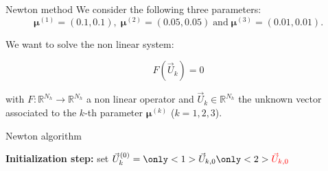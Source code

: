 \begin{frame}{Newton method}
	We consider the following three parameters:
	$$\bm{\mu}^{(1)} = (0.1,0.1), \; \bm{\mu}^{(2)} = (0.05,0.05) \; \text{and} \; \bm{\mu}^{(3)} = (0.01,0.01).$$

	We want to solve the non linear system: %

    \normalsize
    \vspace{-10pt}
    \begin{equation*}
        F(\vec{U}_k) = 0 
    \end{equation*}

    \vspace{-2pt}
    with $F:\mathbb{R}^{N_h} \to \mathbb{R}^{N_h}$ a non linear operator and $\vec{U}_k\in \mathbb{R}^{N_h}$ the unknown vector associated to the $k$-th parameter $\bm{\mu}^{(k)}$ ($k=1,2,3$).

	\setcounter{algocf}{0}
    \begin{center}
        \small
        \begin{minipage}{0.9\linewidth}
            \begin{algorithm}[H]
                \SetAlgoLined
                \caption{Newton algorithm \citep{newton_accel_2025}}
                \textbf{Initialization step:} set $\vec{U}_k^{(0)} = \only<1>{\vec{U}_{k,0}}\only<2>{\textcolor{red}{\vec{U}_{k,0}}}$\;
            \end{algorithm}
        \end{minipage}
    \end{center}
\end{frame}

